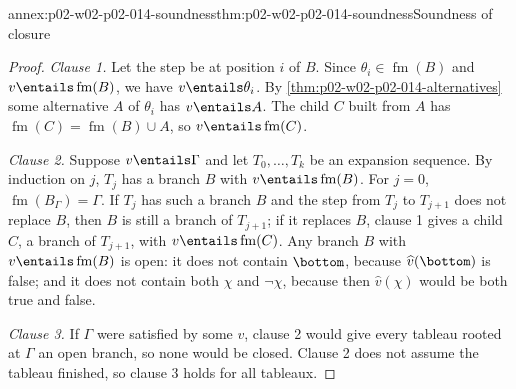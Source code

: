 \begin{annexitem}{annex:p02-w02-p02-014-soundness}{thm:p02-w02-p02-014-soundness}{Soundness of closure}
\begin{proof}
\emph{Clause 1.}  Let the step be at position \(i\) of \(B\).  Since
\(\theta_i\in\operatorname{fm}(B)\) and \(v\entails\operatorname{fm}(B)\), we have \(v\entails\theta_i\).
By \cref{thm:p02-w02-p02-014-alternatives} some alternative \(A\) of
\(\theta_i\) has \(v\entails A\).  The child \(C\) built from \(A\) has
\(\operatorname{fm}(C)=\operatorname{fm}(B)\cup A\), so \(v\entails\operatorname{fm}(C)\).

\emph{Clause 2.}  Suppose \(v\entails\Gamma\) and let \(T_0,\ldots,T_k\) be
an expansion sequence.  By induction on \(j\), \(T_j\) has a branch \(B\)
with \(v\entails\operatorname{fm}(B)\).  For \(j=0\), \(\operatorname{fm}(B_\Gamma)=\Gamma\).  If \(T_j\) has
such a branch \(B\) and the step from \(T_j\) to \(T_{j+1}\) does not replace
\(B\), then \(B\) is still a branch of \(T_{j+1}\); if it replaces \(B\),
clause 1 gives a child \(C\), a branch of \(T_{j+1}\), with
\(v\entails\operatorname{fm}(C)\).  Any branch \(B\) with \(v\entails\operatorname{fm}(B)\) is open: it does
not contain \(\bottom\), because \(\widehat v(\bottom)\) is false; and it does
not contain both \(\chi\) and \(\neg\chi\), because then
\(\widehat v(\chi)\) would be both true and false.

\emph{Clause 3.}  If \(\Gamma\) were satisfied by some \(v\), clause 2 would
give every tableau rooted at \(\Gamma\) an open branch, so none would be
closed.  Clause 2 does not assume the tableau finished, so clause 3 holds
for all tableaux.
\end{proof}
\end{annexitem}

